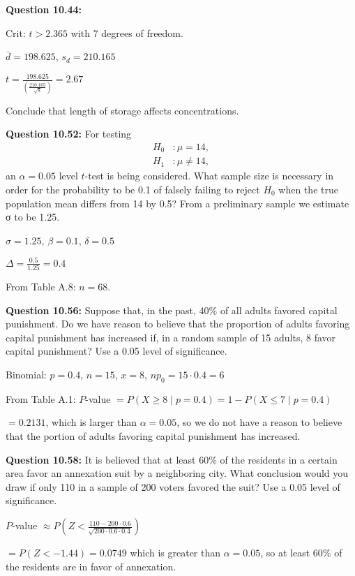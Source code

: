 \documentclass{article}
\begin{document}
\textbf{Question 10.44:}
\begin{description}
    \item Crit: $t>2.365$ with 7 degrees of freedom.
    \item $\bar{d}=198.625$, $s_d=210.165$
    \item $t=\frac{198.625}{(\frac{210.165}{\sqrt{8}})}=2.67$
    \item Conclude that length of storage affects concentrations.
\end{description}

\textbf{Question 10.52:}
For testing
\begin{align*}
    H_0 &: \mu = 14,\\
    H_1 &: \mu \not= 14,
\end{align*}
an $\alpha = 0.05$ level $t$-test is being considered. What 
sample size is necessary in order for the probability to be
0.1 of falsely failing to reject $H_0$ when the true 
population mean differs from 14 by 0.5? From a preliminary
sample we estimate σ to be 1.25.
\begin{description}
    \item $\sigma=1.25$, $\beta=0.1$, $\delta=0.5$
    \item $\Delta=\frac{0.5}{1.25} = 0.4$
    \item From Table A.8: $n=68$.
\end{description}

\textbf{Question 10.56:}
Suppose that, in the past, 40\% of all adults
favored capital punishment. Do we have reason to
believe that the proportion of adults favoring capital
punishment has increased if, in a random sample of 15
adults, 8 favor capital punishment? Use a 0.05 level of
significance.
\begin{description}
    \item Binomial: $p=0.4$, $n=15$, $x=8$, $np_0=15\cdot 0.4 = 6$
    \item From Table A.1: $P$-value $=P(X\geq 8 \mid p=0.4) = 1 - P(X\leq 7 \mid p=0.4)$
    \item $ = 0.2131$, which is larger than $\alpha =0.05$, so we do not have a reason to
    believe that the portion of adults favoring capital punishment has increased.
\end{description}

\textbf{Question 10.58:}
It is believed that at least 60\% of the residents
in a certain area favor an annexation suit by a 
neighboring city. What conclusion would you draw if only
110 in a sample of 200 voters favored the suit? Use a
0.05 level of significance.
\begin{description}
    \item $P$-value $\approx P(Z < \frac{110-200\cdot 0.6}{\sqrt{200 \cdot 0.6 \cdot 0.4}})$
    \item $= P(Z < -1.44) = 0.0749$ which is greater than $\alpha=0.05$, so at least 60\% of the 
    residents are in favor of annexation.
\end{description}
\end{document}
